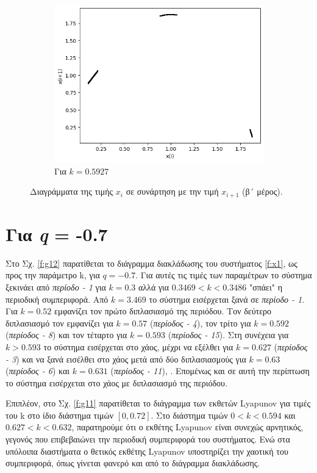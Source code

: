 \begin{figure}[ht]
\begin{subfigure}[b]{0.4\textwidth}
		\includegraphics[width=\textwidth]{LateX images/graphs q05/g11}
		\caption{Για $k=0.5927$}
		\label{f:k36}
	\end{subfigure}
	\hfill
	\caption{Διαγράμματα της τιμής \(x_i\) σε συνάρτηση με την τιμή \(x_{i+1}\) (β´ μέρος).}		
\end{figure}

\clearpage

\section{Για \emph{q} = -0.7}

Στο Σχ. \ref{f:g12} παρατίθεται το διάγραμμα διακλάδωσης του συστήματος \ref{f:x1}, ως προς την παράμετρο k, για $q =- 0.7$. Για αυτές τις τιμές των παραμέτρων το σύστημα ξεκινάει από \emph{περίοδο - 1} για $k=0.3$ αλλά για $0.3469<k<0.3486$ "σπάει" η περιοδική συμπεριφορά. Από $k=3.469$ το σύστημα εισέρχεται ξανά σε \emph{περίοδο - 1}. Για  $k = 0.52$ εμφανίζει τον πρώτο διπλασιασμό της περιόδου. Τον δεύτερο διπλασιασμό τον εμφανίζει για $k=0.57$  (\emph{περίοδος - 4}), τον τρίτο για $k=0.592$ (\emph{περίοδος - 8}) και τον τέταρτο για $k=0.593$ (\emph{περίοδος - 15}). Στη συνέχεια για $k>0.593$ το σύστημα εισέρχεται στο χάος, μέχρι να εξέλθει  για $k=0.627$ (\emph{περίοδος -   3}) και να ξανά εισέλθει στο χάος  μετά από δύο διπλασιασμούς για $k=0.63$ (\emph{περίοδος - 6}) και $k=0.631$ (\emph{περίοδος -   11}), .
Επομένως και σε αυτή την περίπτωση το σύστημα εισέρχεται στο χάος με διπλασιασμό της περιόδου. 

Επιπλέον, στο Σχ. \ref{f:g11} παρατίθεται το διάγραμμα των εκθετών Lyapunov για τιμές του k στο ίδιο διάστημα τιμών $[0, 0.72]$. Στο διάστημα τιμών $0<k<0.594$ και $0.627<k<0.632$, παρατηρούμε ότι ο εκθέτης Lyapunov είναι συνεχώς αρνητικός, γεγονός που επιβεβαιώνει την περιοδική συμπεριφορά του συστήματος. Ενώ στα υπόλοιπα διαστήματα ο θετικός εκθέτης Lyapunov υποστηρίζει την χαοτική του συμπεριφορά, όπως γίνεται φανερό και από το διάγραμμα διακλάδωσης.

